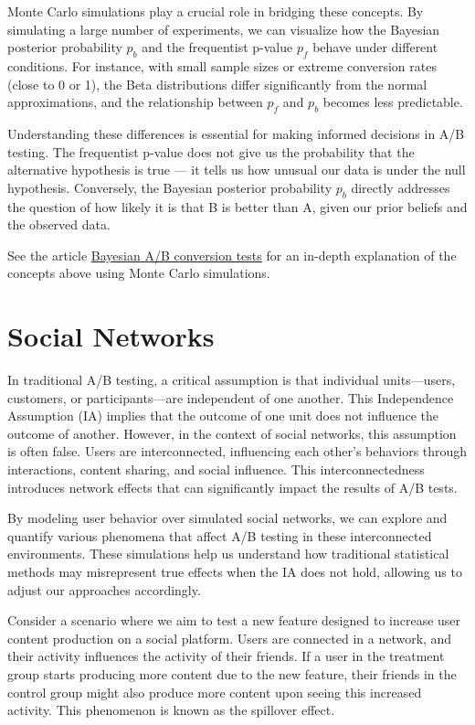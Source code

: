 \documentclass[final,5p,times,twocolumn,authoryear]{elsarticle}
\begin{document}
Monte Carlo simulations play a crucial role in bridging these concepts. By simulating a large number of experiments, we can visualize how the Bayesian posterior probability $ p_b $ and the frequentist p-value $ p_f $ behave under different conditions. For instance, with small sample sizes or extreme conversion rates (close to 0 or 1), the Beta distributions differ significantly from the normal approximations, and the relationship between $ p_f $ and $ p_b $ becomes less predictable.

Understanding these differences is essential for making informed decisions in A/B testing. The frequentist p-value does not give us the probability that the alternative hypothesis is true — it tells us how unusual our data is under the null hypothesis. Conversely, the Bayesian posterior probability $ p_b $ directly addresses the question of how likely it is that B is better than A, given our prior beliefs and the observed data.

See the article \href{https://bytepawn.com/bayesian-ab-conversion-tests.html}{Bayesian A/B conversion tests} for an in-depth explanation of the concepts above using Monte Carlo simulations.

\section{Social Networks}

In traditional A/B testing, a critical assumption is that individual units—users, customers, or participants—are independent of one another. This Independence Assumption (IA) implies that the outcome of one unit does not influence the outcome of another. However, in the context of social networks, this assumption is often false. Users are interconnected, influencing each other's behaviors through interactions, content sharing, and social influence. This interconnectedness introduces network effects that can significantly impact the results of A/B tests.

By modeling user behavior over simulated social networks, we can explore and quantify various phenomena that affect A/B testing in these interconnected environments. These simulations help us understand how traditional statistical methods may misrepresent true effects when the IA does not hold, allowing us to adjust our approaches accordingly.

Consider a scenario where we aim to test a new feature designed to increase user content production on a social platform. Users are connected in a network, and their activity influences the activity of their friends. If a user in the treatment group starts producing more content due to the new feature, their friends in the control group might also produce more content upon seeing this increased activity. This phenomenon is known as the spillover effect.
\end{document}
